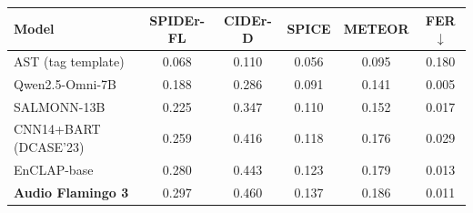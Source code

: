 \begin{tabular}{lccccc}
\toprule
Model & SPIDEr-FL & CIDEr-D & SPICE & METEOR & FER $\downarrow$ \\
\midrule
AST (tag template) & 0.068 & 0.110 & 0.056 & 0.095 & 0.180 \\
Qwen2.5-Omni-7B & 0.188 & 0.286 & 0.091 & 0.141 & 0.005 \\
SALMONN-13B & 0.225 & 0.347 & 0.110 & 0.152 & 0.017 \\
CNN14+BART (DCASE'23) & 0.259 & 0.416 & 0.118 & 0.176 & 0.029 \\
EnCLAP-base & 0.280 & 0.443 & 0.123 & 0.179 & 0.013 \\
\textbf{Audio Flamingo 3} & 0.297 & 0.460 & 0.137 & 0.186 & 0.011 \\
\bottomrule
\end{tabular}
